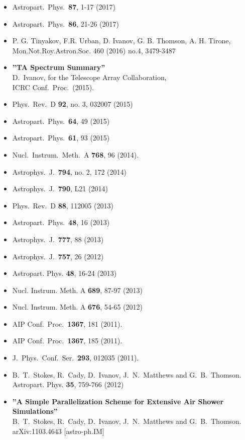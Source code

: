 \documentclass[12pt,letterpaper]{article} %
\begin{document}
{\begin{itemize}
	\item Astropart.\ Phys.\  {\bf 87}, 1-17 (2017)
	\item Astropart.\ Phys.\  {\bf 86}, 21-26 (2017)
	\item P. G. Tinyakov, F.R. Urban, D. Ivanov, G. B. Thomson, A. H. Tirone, Mon.Not.Roy.Astron.Soc. 460 (2016) no.4, 3479-3487
	\item{\bf ''TA Spectrum Summary''}
	\\{}D.~Ivanov, for the Telescope Array Collaboration,
	\\{}ICRC Conf.\ Proc.\ (2015). %
	\item Phys.\ Rev.\ D {\bf 92}, no. 3, 032007 (2015)
	\item Astropart.\ Phys.\  {\bf 64}, 49 (2015)
	\item Astropart.\ Phys.\  {\bf 61}, 93 (2015)
	\item Nucl.\ Instrum.\ Meth.\ A {\bf 768}, 96 (2014).
	\item Astrophys.\ J.\  {\bf 794}, no. 2, 172 (2014)
	\item Astrophys.\ J.\  {\bf 790}, L21 (2014)
	\item Phys.\ Rev.\ D {\bf 88}, 112005 (2013)
	\item Astropart.\ Phys.\  {\bf 48}, 16 (2013)
	\item Astrophys.\ J.\  {\bf 777}, 88 (2013)
	\item Astrophys.\ J.\  {\bf 757}, 26 (2012)
	\item Astropart. Phys. \textbf{48}, 16-24 (2013)
	\item Nucl. Instrum. Meth. A \textbf{689}, 87-97 (2013)
	\item Nucl. Instrum. Meth. A \textbf{676}, 54-65 (2012)
	\item AIP Conf.\ Proc.\  {\bf 1367}, 181 (2011). %
	
	\item {}AIP Conf.\ Proc.\  {\bf 1367}, 185 (2011). %
	\item J.\ Phys.\ Conf.\ Ser.\  {\bf 293}, 012035 (2011). %
	\item B.~T.~Stokes, R.~Cady, D.~Ivanov, J.~N.~Matthews and G.~B.~Thomson. Astropart. Phys. \textbf{35}, 759-766 (2012)

	\item {\bf ''A Simple Parallelization Scheme for Extensive Air Shower Simulations''}
	\\{}B.~T.~Stokes, R.~Cady, D.~Ivanov, J.~N.~Matthews and G.~B.~Thomson.
	\\{}arXiv:1103.4643 [astro-ph.IM]


\end{itemize}}
\end{document}
